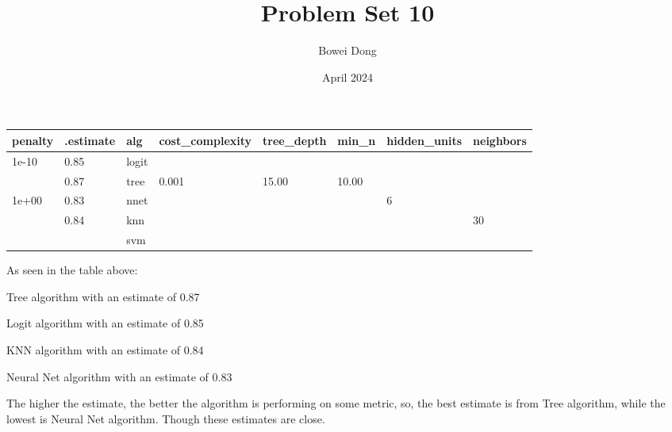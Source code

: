 \documentclass{article}
\title{Problem Set 10}
\author{Bowei Dong }
\date{April 2024}
\begin{document}
\maketitle

\begin{table}[h]
\begin{tabular}{|l|l|l|l|l|l|l|l|}
\hline
\textbf{penalty} & \textbf{.estimate} & \textbf{alg} & \textbf{cost\_complexity} & \textbf{tree\_depth} & \textbf{min\_n} & \textbf{hidden\_units} & \textbf{neighbors}\\ \hline
1e-10            & 0.85               & logit        &                           &                      &                 &                  &      \\
                 & 0.87               & tree         & 0.001                     & 15.00                & 10.00           &                    &    \\
1e+00             & 0.83               & nnet         &                           &                      &                 & 6             &         \\ 
   & 0.84 & knn & & & & & 30\\
   &       & svm & & & & & \\
   \hline
\end{tabular}
\end{table}

As seen in the table above:

Tree algorithm with an estimate of 0.87

Logit algorithm with an estimate of 0.85

KNN algorithm with an estimate of 0.84

Neural Net algorithm with an estimate of 0.83

The higher the estimate, the better the algorithm is performing on some metric, so, the best estimate is from Tree algorithm, while the lowest is Neural Net algorithm. Though these estimates are close. 
\end{document}
